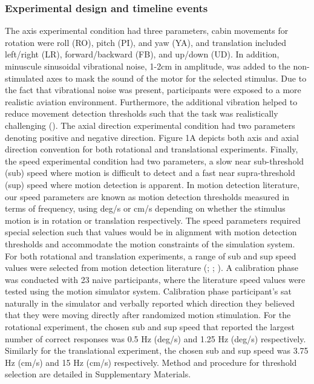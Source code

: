 \documentclass[11pt, onecolumn]{article}
\begin{document}
\subsubsection{Experimental design and timeline events}
The axis experimental condition had three parameters, cabin movements for rotation were roll (RO), pitch (PI), and yaw (YA), and translation included left/right (LR), forward/backward (FB), and up/down (UD).  In addition, minuscule sinusoidal vibrational noise, 1-2cm in amplitude, was added to the non-stimulated axes to mask the sound of the motor for the selected stimulus.  Due to the fact that vibrational noise was present, participants were exposed to a more realistic aviation environment.  Furthermore, the additional vibration helped to reduce movement detection thresholds such that the task was realistically challenging (\cite{Chaudhuri_2013_Wholebody}).  The axial direction experimental condition had two parameters denoting positive and negative direction.  Figure 1A depicts both axis and axial direction convention for both rotational and translational experiments.  Finally, the speed experimental condition had two parameters, a slow near sub-threshold (sub) speed where motion is difficult to detect and a fast near supra-threshold (sup) speed where motion detection is apparent.  In motion detection literature, our speed parameters are known as motion detection thresholds measured in terms of frequency, using deg/s or cm/s depending on whether the stimulus motion is in rotation or translation respectively.  The speed parameters required special selection such that values would be in alignment with motion detection thresholds and accommodate the motion constraints of the simulation system.  For both rotational and translation experiments, a range of sub and sup speed values were selected from motion detection literature (\cite{Previc_2004_Spatial}; \cite{Melvill_1978_Vertical}; \cite{Hartmann_2014_Direction}).  A calibration phase was conducted with 23 naive participants, where the literature speed values were tested using the motion simulator system.  Calibration phase participant’s sat naturally in the simulator and verbally reported which direction they believed that they were moving directly after randomized motion stimulation.  For the rotational experiment, the chosen sub and sup speed that reported the largest number of correct responses was 0.5 Hz (deg/s) and 1.25 Hz (deg/s) respectively.  Similarly for the translational experiment, the chosen sub and sup speed was 3.75 Hz (cm/s) and 15 Hz (cm/s) respectively.  Method and procedure for threshold selection are detailed in Supplementary Materials.
\end{document}

